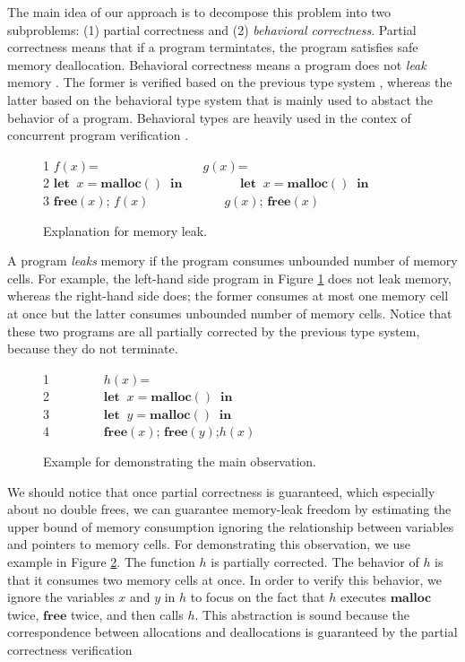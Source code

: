 \documentclass[english]{jssst_ppl} %
\newcommand\LET{\mathbf{let}\;}
\newcommand\IN{\mathbf{in}\;}
\newcommand\MALLOC{\mathbf{malloc()}\;}
\newcommand\Malloc{\mathbf{malloc}}
\newcommand\Free{\mathbf{free}}
\newcommand\Cirx{(x)}
\newcommand\dtb{\;\;\ \;\;\ \;\;\ \;\;\  }
\begin{document}
The main idea of our approach is to decompose this problem into two subproblems: (1) partial correctness and (2) \emph{behavioral correctness}. Partial correctness means that if a program termintates, the program satisfies safe memory deallocation. Behavioral correctness means a program does not \emph{leak} memory . The former is verified based on the previous type system \cite{DBLP:conf/aplas/SuenagaK09}, whereas the latter based on the behavioral type system that is mainly used to abstact the behavior of a program. Behavioral types are heavily used in the contex of concurrent program verification \cite{DBLP:journals/lmcs/KobayashiSW06,DBLP:journals/tcs/IgarashiK04,DBLP:conf/esop/HondaVK98}.
\begin{figure}[h]
1 \;\; $f(x)$= \dtb\dtb \dtb \dtb$g(x)$= \\
2 \;\; $\LET \; x = \MALLOC  \; \IN$ \dtb \dtb\;$\LET \; x = \MALLOC  \; \IN$\\
3 \;\; $\Free\Cirx$; \; $f(x)$\dtb\dtb\dtb\;$g(x)$; \; $\Free\Cirx$
\caption{Explanation for memory leak.}
\label{example:memoryLeak}
\end{figure}
A program \emph{leaks} memory if the program consumes unbounded number of memory cells. For example, the left-hand side program in Figure \ref{example:memoryLeak} does not leak memory, whereas the right-hand side does; the former consumes at most one memory cell at once but the latter consumes unbounded number of memory cells. Notice that these two programs are all partially corrected by the previous type system, because they do not terminate.
\begin{figure}[h]
1\dtb \dtb \;\; $h(x)$=\\
2\dtb \dtb\;\; $\LET \; x = \MALLOC  \; \IN$\\
3\dtb \dtb\;\; $\LET \; y = \MALLOC  \; \IN$\\
4\dtb \dtb\;\; $\Free\Cirx$; \; $\Free(y) $;\;$h(x)$
\caption{Example for demonstrating the main observation.}
\label{example:observation}
\end{figure}
We should notice that once partial correctness is guaranteed, which especially about no double frees, we can guarantee memory-leak freedom by estimating the upper bound of memory consumption ignoring the relationship between variables and pointers to memory cells. For demonstrating this observation, we use  example in Figure \ref{example:observation}. The function $h$ is partially corrected. The behavior of $h$ is that it consumes two memory cells at once. In order to verify this behavior, we ignore the variables $x$ and $y$ in $h$ to focus on the fact that $h$ executes $\Malloc$ twice, $\Free$ twice, and then calls $h$. This abstraction is sound because the correspondence between allocations and deallocations is guaranteed by the partial correctness verification
\end{document}

